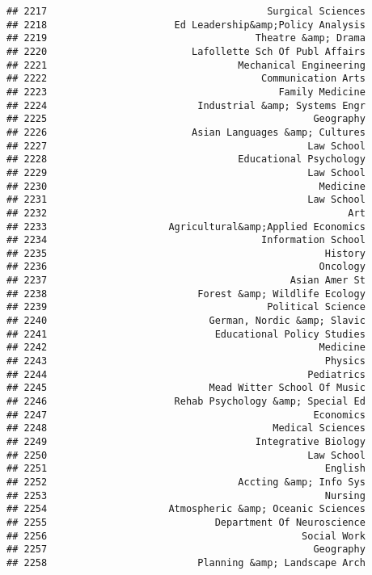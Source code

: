 \documentclass[
]{article}
\begin{document}
\begin{verbatim}
## 2217                                      Surgical Sciences
## 2218                      Ed Leadership&amp;Policy Analysis
## 2219                                    Theatre &amp; Drama
## 2220                         Lafollette Sch Of Publ Affairs
## 2221                                 Mechanical Engineering
## 2222                                     Communication Arts
## 2223                                        Family Medicine
## 2224                          Industrial &amp; Systems Engr
## 2225                                              Geography
## 2226                         Asian Languages &amp; Cultures
## 2227                                             Law School
## 2228                                 Educational Psychology
## 2229                                             Law School
## 2230                                               Medicine
## 2231                                             Law School
## 2232                                                    Art
## 2233                     Agricultural&amp;Applied Economics
## 2234                                     Information School
## 2235                                                History
## 2236                                               Oncology
## 2237                                          Asian Amer St
## 2238                          Forest &amp; Wildlife Ecology
## 2239                                      Political Science
## 2240                            German, Nordic &amp; Slavic
## 2241                             Educational Policy Studies
## 2242                                               Medicine
## 2243                                                Physics
## 2244                                             Pediatrics
## 2245                            Mead Witter School Of Music
## 2246                      Rehab Psychology &amp; Special Ed
## 2247                                              Economics
## 2248                                       Medical Sciences
## 2249                                    Integrative Biology
## 2250                                             Law School
## 2251                                                English
## 2252                                 Accting &amp; Info Sys
## 2253                                                Nursing
## 2254                     Atmospheric &amp; Oceanic Sciences
## 2255                             Department Of Neuroscience
## 2256                                            Social Work
## 2257                                              Geography
## 2258                          Planning &amp; Landscape Arch

\end{verbatim}
\end{document}
